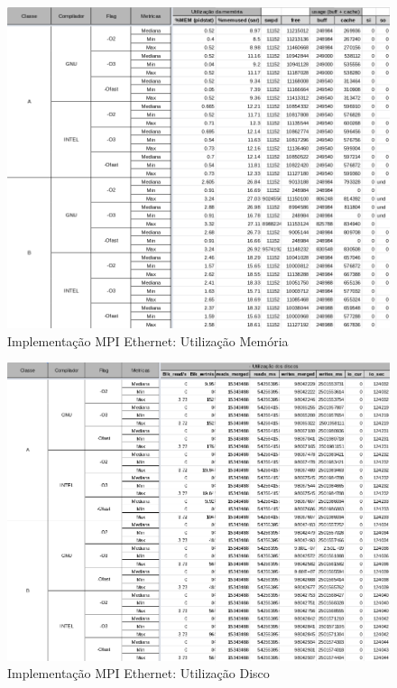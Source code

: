 \documentclass{article}
\begin{document}
\begin{appendices}
\begin{figure}[H]
    \centering
    \includegraphics[width=12cm]{Pictures/FT_r431_MPIE_MEM.png}
    \caption{Implementação MPI Ethernet: Utilização Memória}
    \label{figure:FT_r431_MPIE_MEM}
\end{figure}

\begin{figure}[H]
    \centering
    \includegraphics[width=12cm]{Pictures/FT_r431_MPIE_DISK.png}
    \caption{Implementação MPI Ethernet: Utilização Disco}
    \label{figure:FT_r431_MPIE_DISK}
\end{figure}


\end{appendices}
\end{document}
